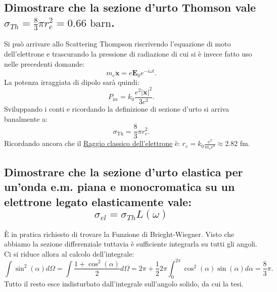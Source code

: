 \subsection[]{Dimostrare che la sezione d’urto Thomson vale $\sigma_{Th} = \frac{8}{3}\pi r_{e}^2  = 0.66 \text{ barn}$.}
Si può arrivare allo Scattering Thompson riscrivendo l'equazione di moto dell'elettrone e trascurando la pressione di radiazione di cui si è invece fatto uso nelle precedenti domande:
\[
m_e \ddot{\boldsymbol{x}}= e \boldsymbol{E}_0 e^{-i \omega t}
.\] 
La potenza irraggiata di dipolo sarà quindi:
\[
P_{\text{irr}} = k_0 \frac{e^2 \left| \ddot{\boldsymbol{x}} \right|^2}{3c^3} 
.\]
Sviluppando i conti e ricordando la definizione di sezione d'urto si arriva banalmente a:
\[
\sigma_{\text{Th}}=\frac{8}{3}\pi r_e^2
.\] 
Ricordando ancora che il \hyperref[eq: raggio classico]{Raggio classico dell'elettrone} è: $r_e = k_0 \frac{e^2}{m_e c^2} \approx 2.82$ fm.

\subsection[]{Dimostrare che la sezione d’urto elastica per un’onda e.m. piana e monocromatica su un elettrone legato elasticamente vale:
\[
	\sigma_{el} = \sigma_{Th} L\left( \omega \right) 
\] 
}
È in pratica richiesto di trovare la Funzione di Brieght-Wiegner. Visto che abbiamo la sezione differenziale tuttavia è sufficiente integrarla su tutti gli angoli. Ci si riduce allora al calcolo dell'integrale:
\[
	\int \sin^2\left( \alpha  \right) d \Omega = \int \frac{1 + \cos^2\left( \alpha \right) }{2} d\Omega = 2\pi + \frac{1}{2} 2 \pi \int_0^{2\pi} \cos^2\left( \alpha  \right) \sin\left( \alpha  \right) d \alpha = \frac{8}{3}\pi  
.\] 
Tutto il resto esce indisturbato dall'integrale sull'angolo solido, da cui la tesi.

